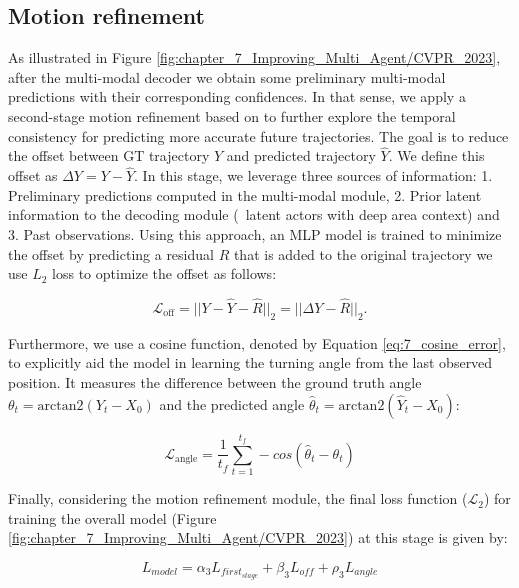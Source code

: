 \subsection{Motion refinement}
\label{subsec:refinement}

As illustrated in Figure \ref{fig:chapter_7_Improving_Multi_Agent/CVPR_2023}, after the multi-modal decoder we obtain some preliminary multi-modal predictions with their corresponding confidences. In that sense, we apply a second-stage motion refinement based on \cite{liu2023laformer} to further explore the temporal consistency for predicting more accurate future trajectories. The goal is to reduce the offset between \ac{GT} trajectory $Y$ and predicted trajectory $\hat{Y}$. We define this offset as $\Delta{Y} = Y - \hat{Y}$. In this stage, we leverage three sources of information: 1. Preliminary predictions computed in the multi-modal module, 2. Prior latent information to the decoding module (\ie \ latent actors with deep area context) and 3. Past observations. Using this approach, an \ac{MLP} model is trained to minimize the offset by predicting a residual $R$ that is added to the original trajectory \ie we use $L_2$ loss to optimize the offset as follows:

\begin{equation}
	\label{eq:5_pose_error}
	\mathcal{L}_\text{off}= ||{Y} - \hat{Y} - \hat{R}||_2 = ||\Delta{Y} - \hat{R}||_2.
\end{equation}

Furthermore, we use a cosine function, denoted by Equation \ref{eq:7_cosine_error}, to explicitly aid the model in learning the turning angle from the last observed position. It measures the difference between the ground truth angle $\theta_{t}= \text{arctan2}(Y_{t}-{X}_{0})$ and the predicted angle $\hat{\theta}_{t}= \text{arctan2}(\hat{Y}_{t}-{X}_{0})$:

\begin{equation}
	\mathcal{L}_{\text{angle}}=\frac{1}{t_{f}}\sum^{t_{f}}_{t=1}-cos(\hat{\theta}_{t}-\theta_{t})
	\label{eq:7_cosine_error}
\end{equation}

Finally, considering the motion refinement module, the final loss function ($\mathcal{L}_2$) for training the overall model (Figure \ref{fig:chapter_7_Improving_Multi_Agent/CVPR_2023}) at this stage is given by:

\begin{equation}
	L_{model} = \alpha_3 L_{first_{stage}} + \beta_3 L_{off} + \rho_3 L_{angle}
\end{equation}

